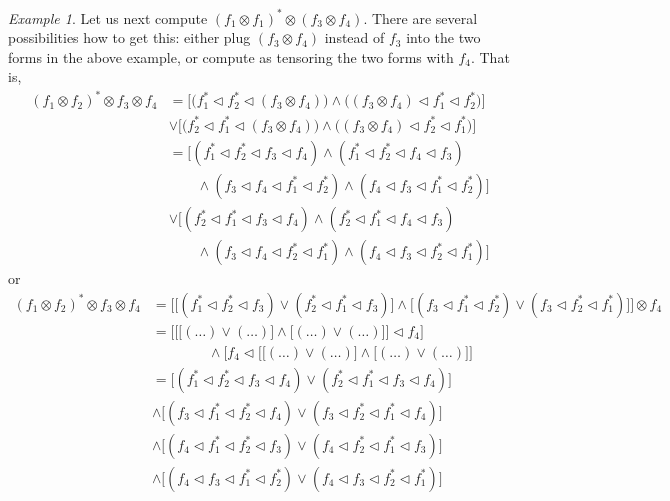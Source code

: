 \documentclass[12pt]{article}
\theoremstyle{definition}
\theoremstyle{remark}
\newtheorem{exm}{Example}
\def\vtl{\vartriangleleft}
\begin{document}
\begin{exm}\label{example:tensor34} Let us next compute $(f_1\otimes f_1)^*\otimes (f_3\otimes f_4)$. 
There are several possibilities how to get this: either plug $(f_3\otimes f_4)$ instead of
$f_3$ into the two forms in the above example, or compute as tensoring the two forms with
$f_4$. That is,
\begin{align*}
(f_1\otimes
f_2)^*\otimes f_3\otimes f_4&=\biggl[\bigl(f^*_1\vtl f^*_2\vtl (f_3\otimes
f_4)\bigl)\wedge \bigl((f_3\otimes f_4)\vtl f_1^*\vtl
f_2^*\bigr)\biggr]\\  &\vee \biggl[\bigl(f^*_2\vtl f^*_1\vtl (f_3\otimes f_4)\bigl)\wedge
\bigl((f_3\otimes f_4)\vtl
f_2^*\vtl f_1^*\bigr)\biggr]\\
&= \biggl[(f^*_1\vtl f^*_2\vtl f_3\vtl f_4)\wedge (f^*_1\vtl f^*_2\vtl 
f_4\vtl f_3)\\&\qquad\wedge (f_3\vtl f_4\vtl f_1^*\vtl f_2^*)\wedge (f_4\vtl f_3\vtl
f_1^*\vtl f_2^*)\biggr]\\
&\vee\biggl[(f^*_2\vtl f^*_1\vtl f_3\vtl f_4)\wedge (f^*_2\vtl f^*_1\vtl 
f_4\vtl f_3)\\&\qquad\wedge (f_3\vtl f_4\vtl f_2^*\vtl f_1^*)\wedge (f_4\vtl f_3\vtl
f_2^*\vtl f_1^*)\biggr]
\end{align*}
or
\begin{align*}
(f_1\otimes
f_2)^*\otimes f_3\otimes f_4&=\biggl[\bigl[(f^*_1\vtl f^*_2\vtl f_3)\vee (f^*_2\vtl f^*_1\vtl
f_3)\bigr]\wedge \bigl[(f_3\vtl f^*_1\vtl f^*_2)\vee (f_3\vtl f^*_2\vtl
f^*_1)\bigr]\biggr]\otimes f_4\\
&=\biggl[\biggl[\bigl[(\dots)\vee (\dots)\bigr]\wedge
\bigl[(\dots)\vee(\dots)\bigr]\biggr]\vtl f_4 \biggr]\\
&\qquad \qquad \wedge \biggl[f_4\vtl\biggl[\bigl[(\dots)\vee (\dots)\bigr]\wedge
\bigl[(\dots)\vee(\dots)\bigr]\biggr]\\
&=\biggl[(f^*_1\vtl f^*_2\vtl f_3\vtl f_4)\vee (f^*_2\vtl f^*_1\vtl
f_3\vtl f_4)\biggr]\\
&\wedge \biggl[(f_3\vtl f^*_1\vtl f^*_2\vtl f_4)\vee (f_3\vtl f^*_2\vtl
f^*_1\vtl f_4)\biggr]\\
&\wedge \biggl[(f_4\vtl f^*_1\vtl f^*_2\vtl f_3)\vee (f_4\vtl f^*_2\vtl f^*_1\vtl
f_3)\biggr]\\
&\wedge \biggl[(f_4\vtl f_3\vtl f^*_1\vtl f^*_2)\vee (f_4\vtl f_3\vtl f^*_2\vtl
f^*_1)\biggr]
\end{align*}

\end{exm}
\end{document}
